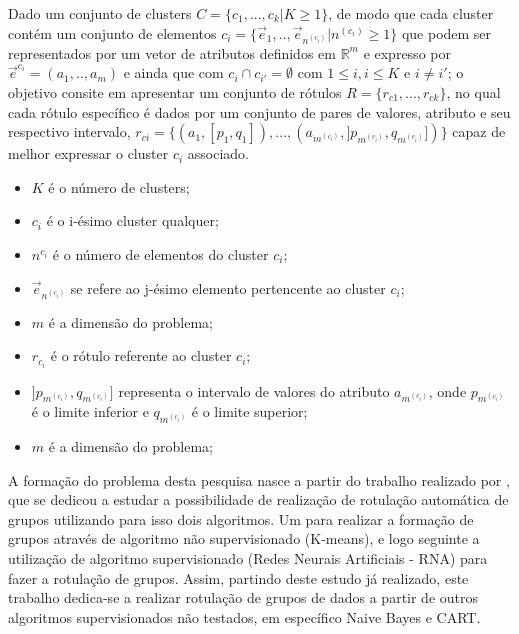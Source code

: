     \begin{teorema}
    Dado um conjunto de clusters ${C=\{c_1,...,c_k | K \geqslant 1\} }$, de modo que cada cluster contém um conjunto de elementos ${c_i=\{\vec{e}_1,..,\vec{e}_{n^{(c_i)}}|n^{(c_i)} \geqslant 1 \}}$ que podem ser representados por um vetor de atributos definidos em ${\mathbb{R}^m }$ e expresso por ${ \vec{e}^{c_i}=(a_1,..,a_m)  }$ e ainda que  com ${ c_i \cap c_{i'}=\emptyset }$ com ${ 1 \leqslant i, i \leqslant K  }$ e ${ i \neq i' }$; o objetivo consite em apresentar um conjunto de rótulos ${ R=\{ r_{c1},...,r_{ck} \} }$, no qual cada rótulo específico é dados por um conjunto de pares de valores, atributo e seu respectivo intervalo, ${ r_{ci}=\{ (a_1,[p_1,q_1]),...,(a_{m^{(c_i)}}, ]p_{m^{(c_i)}},q_{m^{(c_i)}}]) \} }$ capaz de melhor expressar o cluster ${c_i}$ associado.
        \begin{itemize}[noitemsep]
            \item ${K}$ é o número de clusters;
            \item ${c_i}$ é o i-ésimo cluster qualquer;
            \item ${n^{c_i}}$ é o número de elementos do cluster ${c_i}$;
            \item ${\vec{e}_{n^{(c_i)}}}$ se refere ao j-ésimo elemento pertencente ao cluster ${c_i}$;
            \item ${m}$ é a dimensão do problema;
            \item ${r_{c_i}}$ é o rótulo referente ao cluster ${c_i}$;
            \item ${]p_{m^{(c_i)}},q_{m^{(c_i)}}]}$ representa o intervalo de valores do atributo ${a_{m^{(c_i)}} }$, onde ${ p_{m^{(c_i)}} }$  é o limite inferior e ${ q_{m^{(c_i)}} }$ é o limite superior;
            \item ${m}$ é a dimensão do problema;
        \end{itemize}
    \label{teo:lopes:problema}
    \end{teorema}


A formação do problema desta pesquisa nasce a partir do trabalho realizado por ,  que se dedicou a estudar a possibilidade de realização de  rotulação automática de grupos utilizando para isso dois algoritmos. Um para realizar a formação de grupos através de algoritmo não supervisionado (K-means), e logo seguinte a utilização de algoritmo supervisionado (Redes Neurais Artificiais - RNA) para fazer a rotulação de grupos. Assim, partindo deste estudo já realizado, este trabalho dedica-se a realizar rotulação de grupos de dados a partir de outros algoritmos supervisionados não testados, em específico Naive Bayes e CART.

